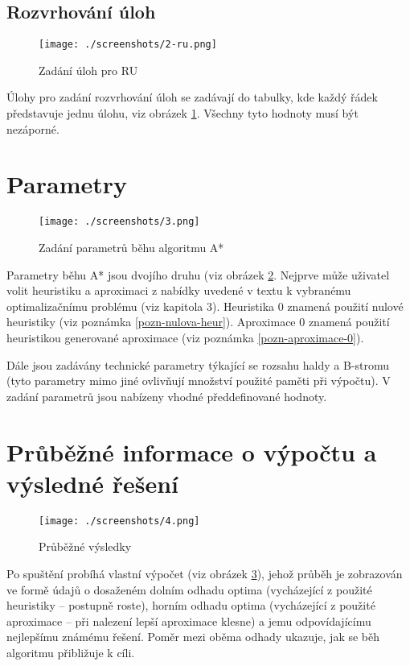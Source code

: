 \documentclass[12pt,notitlepage,fleqn]{report} %
\theoremstyle{definition}
\begin{document}
\subsection{Rozvrhování úloh}
\begin{figure}[h]
 \centering
 \texttt{[image: ./screenshots/2-ru.png]}
 \caption{Zadání úloh pro RU}
 \label{fig:gui-2-ru}
\end{figure}
Úlohy pro zadání rozvrhování úloh se zadávají do tabulky, kde každý řádek představuje jednu úlohu, viz obrázek \ref{fig:gui-2-ru}. Všechny tyto hodnoty musí být nezáporné.

\eject
\section{Parametry}
\begin{figure}[h]
 \centering
 \texttt{[image: ./screenshots/3.png]}
 \caption{Zadání parametrů běhu algoritmu A*}
 \label{fig:gui-3}
\end{figure}
Parametry běhu A* jsou dvojího druhu (viz obrázek \ref{fig:gui-3}. Nejprve může uživatel volit heuristiku a aproximaci z nabídky uvedené v textu k vybranému optimalizačnímu problému (viz kapitola 3). Heuristika 0 znamená použití nulové heuristiky (viz poznámka \ref{pozn-nulova-heur}). Aproximace 0 znamená použití heuristikou generované aproximace (viz poznámka \ref{pozn-aproximace-0}).

Dále jsou zadávány technické parametry týkající se rozsahu haldy a B-stromu (tyto parametry mimo jiné ovlivňují množství použité paměti při výpočtu). V zadání parametrů jsou nabízeny vhodné předdefinované hodnoty.

\section{Průběžné informace o výpočtu a výsledné řešení}
\begin{figure}[h]
 \centering
 \texttt{[image: ./screenshots/4.png]}
 \caption{Průběžné výsledky}
 \label{fig:gui-4}
\end{figure}
Po spuštění probíhá vlastní výpočet (viz obrázek \ref{fig:gui-4}), jehož průběh je zobrazován ve formě údajů o dosaženém dolním odhadu optima (vycházející z použité heuristiky -- postupně roste), horním odhadu optima (vycházející z použité aproximace -- při nalezení lepší aproximace klesne) a jemu odpovídajícímu nejlepšímu známému řešení. Poměr mezi oběma odhady ukazuje, jak se běh algoritmu přibližuje k cíli.
\end{document}
